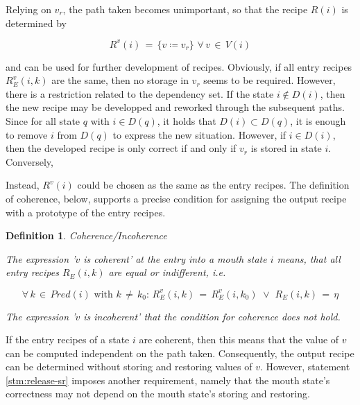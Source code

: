 \documentclass[12pt,a4paper]{scrartcl}
\newtheorem{definition}{Definition}
\begin{document}
Relying on $v_r$, the path taken becomes unimportant, so that the recipe $R(i)$
is determined by

\begin{equation}
    R^v(i) \,=\, \{ v \coloneqq v_r \}\,\,\forall\,v\,\in\,V(i)
\end{equation}

and can be used for further development of recipes. Obviously, if all entry
recipes $R^v_E(i,k)$ are the same, then no storage in $v_r$ seems to be
required. However, there is a restriction related to the dependency set. 
If the state $i\notin D(i)$, then the new recipe may be developped and reworked
through the subsequent paths. Since for all state $q$ with $i\in D(q)$, it holds
that $D(i)\subset D(q)$, it is enough to remove $i$ from $D(q)$ to express the
new situation. However, if $i\in D(i)$, then the developed recipe is only 
correct if and only if $v_r$ is stored in state $i$. Conversely, 

Instead, $R^v(i)$ could be chosen as the same as the entry recipes. The
definition of coherence, below, supports a precise condition for assigning the
output recipe with a prototype of the entry recipes. 

\begin{definition} Coherence/Incoherence

    The expression '$v$ is coherent' at the entry into a mouth state $i$
    means, that all entry recipes $R_E(i,k)$ are equal or indifferent, i.e. 

    \begin{equation} \label{eq:definition-coherence}
         \forall\,k\,\in\,Pred(i)\,\,\mbox{with}\,\,k\,\neq\,k_0:\,R_E^v(i,k)\,=\,R_E^v(i,k_0)\,\,\vee\,\,R_E(i,k)\,=\,\eta
    \end{equation}
        
    The expression '$v$ is incoherent' that the condition for coherence does
    not hold.

\end{definition}

If the entry recipes of a state $i$ are coherent, then this means that the
value of $v$ can be computed independent on the path taken. Consequently, 
the output recipe can be determined without storing and restoring values
of $v$. However, statement \ref{stm:release-sr} imposes another requirement, 
namely that the mouth state's correctness may not depend on the mouth state's
storing and restoring.
\end{document}

